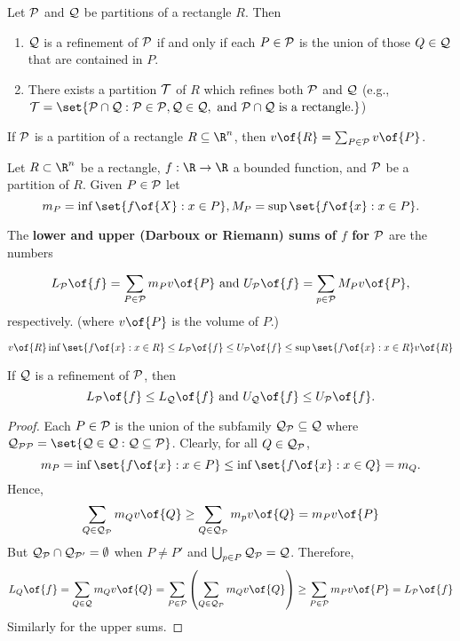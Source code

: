 \begin{lemma}
    Let $\cal{P}$ and $\cal{Q}$ be partitions of a rectangle $R$. Then 
    \begin{enumerate}
        \item $\cal{Q}$ is a refinement of $\cal{P}$ if and only if each $P \in \cal{P}$ is the union of those $Q \in \cal{Q}$ that are contained in $P$.
        \item There exists a partition $\cal{T}$ of $R$ which refines both $\cal{P}$ and $\cal{Q}$ (e.g., $\cal{T} = \set{P \cap Q: P \in \cal{P}, Q \in \cal{Q}, \text{ and } P \cap Q \text{ is a rectangle.}}$)
    \end{enumerate}
\end{lemma}

\begin{lemma}
    If $\cal{P}$ is a partition of a rectangle $R \subseteq \R^n$, then $v\of{R} = \sum_{P \in \cal{P}} v\of{P}$.
\end{lemma}

\begin{definition}
    Let $R \subset \R^n$ be a rectangle, $f: \R \to \R$ a bounded function, and $\cal{P}$ be a partition of $R$. Given $P \in \cal{P}$ let 
    \[m_P= \inf \set{f\of{X}: x \in P}, M_P = \sup \set{f\of{x}: x \in P}.\]

    The \textbf{lower and upper (Darboux or Riemann) sums of $f$ for $\cal{P}$} are the numbers

    \[L_{\cal{P}} \of{f} = \sum_{P \in \cal{P}} m_P v\of{P} \text{ and } U_{\cal{P}} \of{f} = \sum_{p \in \cal{P}} M_P v\of{P},\]
    respectively. (where $v\of{P}$ is the volume of $P$.)
\end{definition}

\begin{remark}
    $v\of{R} \inf \set{f\of{x}: x \in R} \leq L_{\cal{P}}\of{f} \leq U_{\cal{P}}\of{f} \leq \sup \set{f\of{x}: x \in R} v\of{R}$
\end{remark}

\begin{lemma}
    If $\cal{Q}$ is a refinement of $\cal{P}$, then
    \[L_{\cal{P}}\of{f} \leq L_{\cal{Q}}\of{f} \text{ and } U_{\cal{Q}}\of{f} \leq U_{\cal{P}}\of{f}.\]
\end{lemma}

\begin{proof}
    Each $P \in \cal{P}$ is the union of the subfamily $\cal{Q}_P \subseteq \cal{Q}$ where $\cal{Q}_{\cal{P}P} = \set{Q \in \cal{Q}: Q \subseteq P}$. Clearly, for all $Q \in \cal{Q}_P$, 
    \[m_P = \inf \set{f\of{x}: x \in P} \leq \inf \set{f\of{x}: x \in Q} = m_Q.\]
    Hence, 
    \[\sum_{Q \in \cal{Q}_P} m_Q v\of{Q} \geq \sum_{Q \in \cal{Q}_P} m_p v\of{Q} = m_P v\of{P}\]
    But $\cal{Q}_P \cap \cal{Q}_{P'} = \emptyset$ when $P \neq P'$ and $\bigcup_{p \in P} \cal{Q}_P = \cal{Q}$. Therefore,
    \[L_Q\of{f} = \sum_{Q \in \cal{Q}} m_Q v\of{Q} = \sum_{P \in \cal{P}} \left(\sum_{Q \in \cal{Q}_P} m_Q v\of{Q}\right) \geq \sum_{P \in \cal{P}} m_P v\of{P} = L_{\cal{P}}\of{f}\]
    Similarly for the upper sums.
\end{proof}

